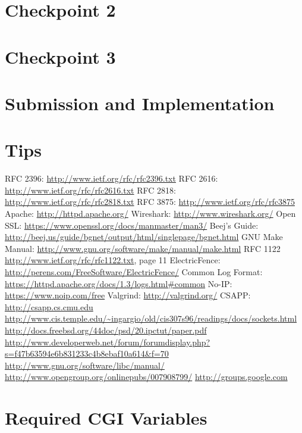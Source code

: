 \documentclass{article}
\begin{document}
\newpage
\section{Checkpoint 2}


\newpage
\section{Checkpoint 3}


\newpage
\section{Submission and Implementation}



\newpage
\section{Tips}


\begin{thebibliography}{1}
RFC 2396: \url{http://www.ietf.org/rfc/rfc2396.txt}
RFC 2616: \url{http://www.ietf.org/rfc/rfc2616.txt}
RFC 2818: \url{http://www.ietf.org/rfc/rfc2818.txt}
RFC 3875: \url{http://www.ietf.org/rfc/rfc3875}
Apache: \url{http://httpd.apache.org/}
Wireshark: \url{http://www.wireshark.org/}
Open SSL: \url{https://www.openssl.org/docs/manmaster/man3/}
Beej's Guide: \url{http://beej.us/guide/bgnet/output/html/singlepage/bgnet.html}
GNU Make Manual:  \url{http://www.gnu.org/software/make/manual/make.html}
RFC 1122 \url{http://www.ietf.org/rfc/rfc1122.txt}, page 11
ElectricFence: \url{http://perens.com/FreeSoftware/ElectricFence/}
Common Log Format: \url{https://httpd.apache.org/docs/1.3/logs.html#common}
No-IP: \url{https://www.noip.com/free}
Valgrind: \url{http://valgrind.org/}
CSAPP: \url{http://csapp.cs.cmu.edu}
\url{http://www.cis.temple.edu/~ingargio/old/cis307s96/readings/docs/sockets.html}
\url{http://docs.freebsd.org/44doc/psd/20.ipctut/paper.pdf}
\url{http://www.developerweb.net/forum/forumdisplay.php?s=f47b63594e6b831233c4b8ebaf10a614&f=70}
\url{http://www.gnu.org/software/libc/manual/}
\url{http://www.opengroup.org/onlinepubs/007908799/}
\url{http://groups.google.com}
\end{thebibliography}

\appendix

\newpage
\section{Required CGI Variables}

\end{document}
